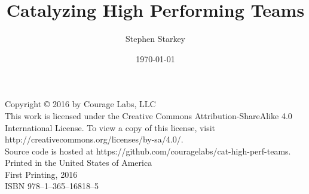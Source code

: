 \documentclass[12pt]{memoir}
\date{\today}
\title{Catalyzing High Performing Teams}
\author{Stephen Starkey}
\begin{document}
\frontmatter

\maketitle

\newpage

\noindent Copyright \copyright{} 2016 by Courage Labs, LLC \\ 

\noindent This work is licensed under the 
Creative Commons Attribution-ShareAlike 4.0 International License. To view a copy of this license, visit 
http://creativecommons.org/licenses/by-sa/4.0/. \\  

\noindent Source code is hosted at https://github.com/couragelabs/cat-high-perf-teams. \\ 

\noindent Printed in the United States of America \\ 

\noindent First Printing, 2016 \\ 

\noindent ISBN 978--1--365--16818--5

\newpage

\setcounter{secnumdepth}{1}
\setcounter{tocdepth}{1}
\tableofcontents
\newpage











\mainmatter








\end{document}
